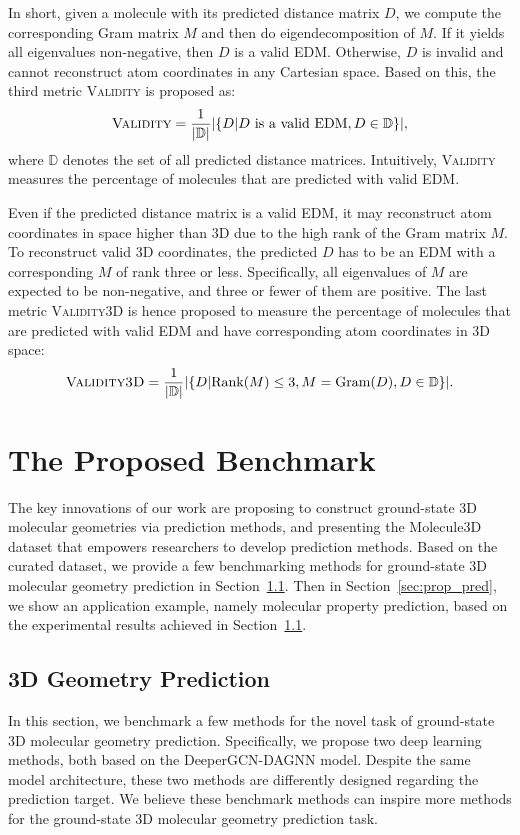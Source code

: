 \documentclass{article}
\begin{document}
In short, given a molecule with its predicted distance matrix $D$, we compute the corresponding Gram matrix $M$ and then do eigendecomposition of $M$. If it yields all eigenvalues non-negative, then $D$ is a valid EDM. Otherwise, $D$ is invalid and cannot reconstruct atom coordinates in any Cartesian space. Based on this, the third metric \textsc{Validity} is proposed as:
\begin{equation}
    \textsc{Validity} = \frac{1}{|\mathbb{D}|} |\{D| D \textrm{\ is\ a\ valid\ EDM}, D \in \mathbb{D} \}|,
\end{equation}
where $\mathbb{D}$ denotes the set of all predicted distance matrices. Intuitively, \textsc{Validity} measures the percentage of molecules that are predicted with valid EDM. 

Even if the predicted distance matrix is a valid EDM, it may reconstruct atom coordinates in space higher than 3D due to the high rank of the Gram matrix $M$. To reconstruct valid 3D coordinates, the predicted $D$ has to be an EDM with a corresponding $M$ of rank three or less. Specifically, all eigenvalues of $M$ are expected to be non-negative, and three or fewer of them are positive. The last metric \textsc{Validity3D} is hence proposed to measure the percentage of molecules that are predicted with valid EDM and have corresponding atom coordinates in 3D space:
\begin{equation}
    \textsc{Validity3D} = \frac{1}{|\mathbb{D}|} |\{D| \textrm{Rank}(M) \le 3, M=\textrm{Gram}(D), D \in \mathbb{D}\}|.
\end{equation}




\section{The Proposed Benchmark}
The key innovations of our work are proposing to construct ground-state 3D molecular geometries via prediction methods, and presenting the Molecule3D dataset that empowers researchers to develop prediction methods. Based on the curated dataset, we provide a few benchmarking methods for ground-state 3D molecular geometry prediction in Section~\ref{sec: geo_pred}. Then in Section~\ref{sec:prop_pred}, we show an application example, namely molecular property prediction, based on the experimental results achieved in Section~\ref{sec: geo_pred}.




\subsection{3D Geometry Prediction}
\label{sec: geo_pred}
In this section, we benchmark a few methods for the novel task of ground-state 3D molecular geometry prediction. Specifically, we propose two deep learning methods, both based on the DeeperGCN-DAGNN model. Despite the same model architecture, these two methods are differently designed regarding the prediction target. We believe these benchmark methods can inspire more methods for the ground-state 3D molecular geometry prediction task.
\end{document}
